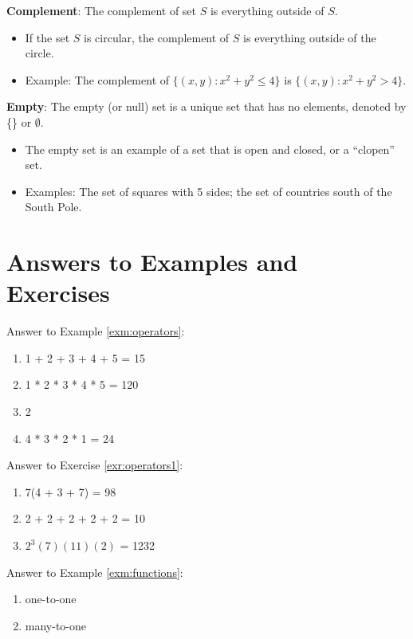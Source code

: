 \documentclass[]{book}
\providecommand{\tightlist}{%
  \setlength{\itemsep}{0pt}\setlength{\parskip}{0pt}}
\theoremstyle{definition}
\theoremstyle{definition}
\theoremstyle{definition}
\theoremstyle{remark}
\begin{document}
\textbf{Complement}: The complement of set \(S\) is everything outside
of \(S\).

\begin{itemize}
\tightlist
\item
  If the set \(S\) is circular, the complement of \(S\) is everything
  outside of the circle.
\item
  Example: The complement of \(\{ (x,y) : x^2+y^2\le 4 \}\) is
  \(\{ (x,y) : x^2+y^2 > 4 \}\).
\end{itemize}

\textbf{Empty}: The empty (or null) set is a unique set that has no
elements, denoted by \{\} or \(\emptyset\).

\begin{itemize}
\tightlist
\item
  The empty set is an example of a set that is open and closed, or a
  ``clopen'' set.
\item
  Examples: The set of squares with 5 sides; the set of countries south
  of the South Pole.
\end{itemize}

\section*{Answers to Examples and
Exercises}\label{answers-to-examples-and-exercises}

Answer to Example \ref{exm:operators}:

\begin{enumerate}
\def\labelenumi{\arabic{enumi}.}
\item
  1 + 2 + 3 + 4 + 5 = 15
\item
  1 * 2 * 3 * 4 * 5 = 120
\item
  2
\item
  4 * 3 * 2 * 1 = 24
\end{enumerate}

Answer to Exercise \ref{exr:operators1}:

\begin{enumerate}
\def\labelenumi{\arabic{enumi}.}
\item
  7(4 + 3 + 7) = 98
\item
  2 + 2 + 2 + 2 + 2 = 10
\item
  \(2^3(7)(11)(2)\) = 1232
\end{enumerate}

Answer to Example \ref{exm:functions}:

\begin{enumerate}
\def\labelenumi{\arabic{enumi}.}
\item
  one-to-one
\item
  many-to-one
\end{enumerate}
\end{document}
